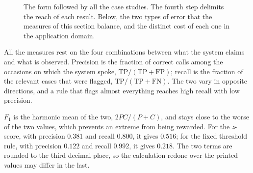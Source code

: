 \begin{figure}[htbp]
\centering
{}
\caption[The form common to the four case studies]{The form followed by all the case studies. The
fourth step delimits the reach of each result. Below, the two types of error that the measures of
this section balance, and the distinct cost of each one in the application domain.}
\label{fig:av_forma}
\end{figure}

All the measures rest on the four combinations between what the system claims and what is
observed. Precision is the fraction of correct calls among the occasions on which the system spoke,
$\mathrm{TP}/(\mathrm{TP}+\mathrm{FP})$; recall is the fraction of the relevant cases that were
flagged, $\mathrm{TP}/(\mathrm{TP}+\mathrm{FN})$. The two vary in opposite directions, and a rule
that flags almost everything reaches high recall with low precision.

$F_1$ is the harmonic mean of
the two, $2PC/(P+C)$, and stays close to the worse of the two values, which prevents an extreme from
being rewarded. For the \emph{z}-score, with precision $0.381$ and recall $0.800$, it gives
$0.516$; for the fixed threshold rule, with precision $0.122$ and recall $0.992$, it gives
$0.218$. The two terms are rounded to the third decimal place, so the calculation redone over the
printed values may differ in the last.

